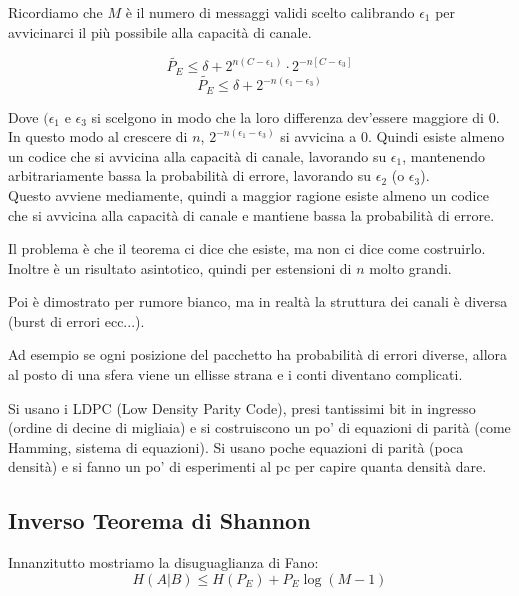 Ricordiamo che $M$ è il numero di messaggi validi scelto calibrando $\epsilon_1$ per avvicinarci il più possibile alla capacità di canale.

\begin{equation*}
\tilde{P_E} \leq \delta + 2^{n(C-\epsilon_1)} \cdot 2^{-n[C - \epsilon_3]}
\end{equation*}
\begin{equation*}
\tilde{P_E} \leq \delta + 2^{-n(\epsilon_1-\epsilon_3)}
\end{equation*}

Dove $(\epsilon_1$ e $\epsilon_3$ si scelgono in modo che la loro differenza dev'essere maggiore di 0.
In questo modo al crescere di $n$, $2^{-n(\epsilon_1 - \epsilon_3)}$ si avvicina a 0.
Quindi esiste almeno un codice che si avvicina alla capacità di canale, lavorando su $\epsilon_1$, mantenendo arbitrariamente bassa la probabilità di errore, lavorando su $\epsilon_2$ (o $\epsilon_3$).\\
Questo avviene mediamente, quindi a maggior ragione esiste almeno un codice che si avvicina alla capacità di canale e mantiene bassa la probabilità di errore.


Il problema è che il teorema ci dice che esiste, ma non ci dice come costruirlo. Inoltre è un risultato asintotico, quindi per estensioni di $n$ molto grandi.

Poi è dimostrato per rumore bianco, ma in realtà la struttura dei canali è diversa (burst di errori ecc...).

Ad esempio se ogni posizione del pacchetto ha probabilità di errori diverse, allora al posto di una sfera viene un ellisse strana e i conti diventano complicati.

Si usano i LDPC (Low Density Parity Code), presi tantissimi bit in ingresso (ordine di decine di migliaia) e si costruiscono un po' di equazioni di parità (come Hamming, sistema di equazioni). Si usano poche equazioni di parità (poca densità) e si fanno un po' di esperimenti al pc per capire quanta densità dare.

\subsection*{Inverso Teorema di Shannon}

Innanzitutto mostriamo la disuguaglianza di Fano:
\begin{equation*}
H(A|B) \leq H(P_E) + P_E\log(M-1)
\end{equation*}

